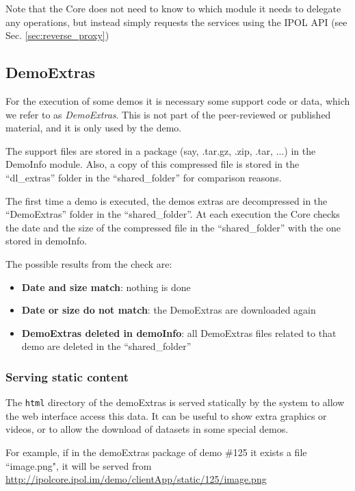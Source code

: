 Note that the Core does not need to know to which module it needs to delegate any operations, but instead simply requests the services using the IPOL API (see Sec. \ref{sec:reverse_proxy})

\subsection{DemoExtras}
\label{sec:demoextras} 
For the execution of some demos it is necessary some support code or data, which we refer to as \emph{DemoExtras}. This is not part of the peer-reviewed or published material, and it is only used by the demo.

The support files are stored in a package (say, .tar.gz, .zip, .tar, ...) in the DemoInfo module. Also, a copy of this compressed file is stored in the ``dl\_extras'' folder in the ``shared\_folder'' for comparison reasons. 

The first time a demo is executed, the demos extras are decompressed in the ``DemoExtras'' folder in the ``shared\_folder''. At each execution the Core checks the date and the size of the compressed file in the ``shared\_folder'' with the one stored in demoInfo. 

The possible results from the check are:
\begin{itemize}
    \item \textbf{Date and size match}: nothing is done
    \item \textbf{Date or size do not match}: the DemoExtras are downloaded again
    \item \textbf{DemoExtras deleted in demoInfo}: all DemoExtras files related to that demo are deleted in the ``shared\_folder''
\end{itemize}

\subsubsection{Serving static content}
The {\tt html} directory of the demoExtras is served statically by the system to allow the web interface access this data. It can be useful to show extra graphics or videos, or to allow the download of datasets in some special demos.

For example, if in the demoExtras package of demo \#125 it exists a file ``image.png", it will be served from \url{http://ipolcore.ipol.im/demo/clientApp/static/125/image.png}


